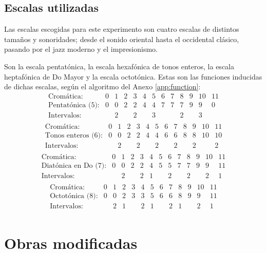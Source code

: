 	\subsection{Escalas utilizadas}
	
		Las escalas escogidas para este experimento son cuatro escalas de distintos tamaños y sonoridades; desde el sonido oriental hasta el occidental clásico, pasando por el jazz moderno y el impresionismo.
		
		Son la escala pentatónica, la escala hexafónica de tonos enteros, la escala heptafónica de Do Mayor y la escala octotónica. Estas son las funciones inducidas de dichas escalas, según el algoritmo del Anexo \ref{app:function}:
		\[\left.\begin{matrix}
		\text{Cromática:}&0&1&2&3&4&5&6&7&8&9&10&11\\
		\text{Pentatónica (5):}&0&0&2&2&4&4&7&7&7&9&9&0\\
		\text{Intervalos:}&&2&&2&&3&&&2&&3&\\
		\end{matrix}\right.\]		
		\[\left.\begin{matrix}
		\text{Cromática:}&0&1&2&3&4&5&6&7&8&9&10&11\\
		\text{Tonos enteros (6):}&0&0&2&2&4&4&6&6&8&8&10&10\\
		\text{Intervalos:}&&2&&2&&2&&2&&2&&2\\
		\end{matrix}\right.\]
        \[\left.\begin{matrix}
        \text{Cromática:}&0&1&2&3&4&5&6&7&8&9&10&11\\
        \text{Diatónica en Do (7):}&0&0&2&2&4&5&5&7&7&9&9&11\\
        \text{Intervalos:}&&2&&2&1&&2&&2&&2&1\\
        \end{matrix}\right.\]        
        \[\left.\begin{matrix}
        \text{Cromática:}&0&1&2&3&4&5&6&7&8&9&10&11\\
        \text{Octotónica (8):}&0&0&2&3&3&5&6&6&8&9&9&11\\
        \text{Intervalos:}&&2&1&&2&1&&2&1&&2&1\\
        \end{matrix}\right.\]
        
	\section{Obras modificadas}
                
